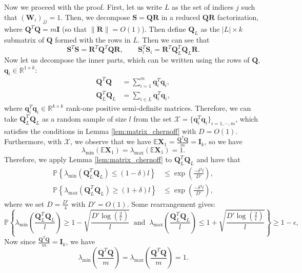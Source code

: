\documentclass[twoside,11pt]{article}
\newcommand{\md}[1]{\mathbb{#1}}
\begin{document}
Now we  proceed with the proof.
 First, let us write $L$ as the set of indices $j$ such that $(\bm{W}_i)_{jj}=1$. Then, we  decompose $\bm{S}=\bm{Q}\bm{R}$ in a reduced $\bm{Q}\bm{R}$ factorization, where $\bm{Q}^T\bm{Q}=m\bm{I}$ (so that $\|\bm{R}\|=O(1)$). Then define $\bm{Q}_L$ as the $|L|\times k$ submatrix of $\bm{Q}$ formed with the rows in $L$. Then we can see that
\[\bm{S}^T\bm{S}=\bm{R}^T\bm{Q}^T\bm{Q}\bm{R},\qquad \bm{S}_i^T\bm{S}_i=\bm{R}^T\bm{Q}_L^T\bm{Q}_L\bm{R}.\]
Now let us decompose the inner parts, which can be written using the rows of $\bm{Q}$, $\bm{q}_i \in \md{R}^{1 \times k}$:
\begin{align*}
\bm{Q}^T\bm{Q}&=\sum_{i=1}^m \bm{q}_i^T\bm{q}_i,\\
\bm{Q}^T_L\bm{Q}_L&=\sum_{i\in L} \bm{q}_i^T\bm{q}_i,
\end{align*}
where $\bm{q}_i^T\bm{q}_i \in \md{R}^{k \times k}$ rank-one positive semi-definite matrices. Therefore, we can take $\bm{Q}^T_L\bm{Q}_L$ as a random sample of size $l$ from the set $\mathcal{X}=\{\bm{q}_i^T\bm{q}_i\}_{i=1,\cdots,m}$, which satisfies the conditions in Lemma \ref{lem:matrix_chernoff} with $D=O(1)$. Furthermore, with $\mathcal{X}$, we observe that we have $\md{E} \bm{X}_1=\frac{\bm{Q}^T\bm{Q}}{m}=\bm{I}_k$, so we have
\[\lambda_{\min}(\md{E} \bm{X}_1)=\lambda_{\max}(\md{E} \bm{X}_1)=1.\]
Therefore, we apply Lemma \ref{lem:matrix_chernoff} to $\bm{Q}_L^T\bm{Q}_L$ and have that
\begin{align*}
\md{P}\left\{\lambda_{\min} \left(\bm{Q}_L^T\bm{Q}_L\right)\leq (1-\delta)l\right\}&\leq \exp\left(\frac{-\delta^2l}{D'}\right),\\
\md{P}\left\{\lambda_{\max} \left(\bm{Q}_L^T\bm{Q}_L\right)\geq (1+\delta)l\right\}&\leq \exp\left(\frac{-\delta^2l}{D'}\right),
\end{align*}
where we set $D=\frac{D'}{4}$ with $D'=O(1)$. Some rearrangement gives:
\begin{equation}
\label{eq:matrix_eig_ineq}
\md{P}\left\{\lambda_{\min} \left(\frac{\bm{Q}_L^T\bm{Q}_L}{l}\right)\geq 1-\sqrt{\frac{D'\log\left(\frac{2}{\epsilon}\right)}{l}} \;\;  \text{and} \;\; \lambda_{\max} \left(\frac{\bm{Q}_L^T\bm{Q}_L}{l}\right)\leq 1+\sqrt{\frac{D'\log\left(\frac{2}{\epsilon}\right)}{l}}\right\}\geq 1 - \epsilon,
\end{equation}
Now since $\frac{\bm{Q}^T\bm{Q}}{m}=\bm{I}_k$, we have
\begin{equation}
\label{eq:matrix_eig_ineq2}
\lambda_{\min}\left(\frac{\bm{Q}^T\bm{Q}}{m}\right)=\lambda_{\max}\left(\frac{\bm{Q}^T\bm{Q}}{m}\right)=1.
\end{equation}
\end{document}
